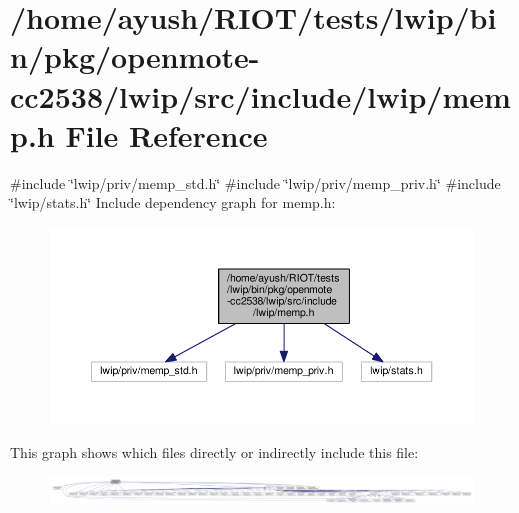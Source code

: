 \hypertarget{openmote-cc2538_2lwip_2src_2include_2lwip_2memp_8h}{}\section{/home/ayush/\+R\+I\+O\+T/tests/lwip/bin/pkg/openmote-\/cc2538/lwip/src/include/lwip/memp.h File Reference}
\label{openmote-cc2538_2lwip_2src_2include_2lwip_2memp_8h}
{\ttfamily \#include \char`\"{}lwip/priv/memp\+\_\+std.\+h\char`\"{}}\newline
{\ttfamily \#include \char`\"{}lwip/priv/memp\+\_\+priv.\+h\char`\"{}}\newline
{\ttfamily \#include \char`\"{}lwip/stats.\+h\char`\"{}}\newline
Include dependency graph for memp.\+h\+:
\nopagebreak
\begin{figure}[H]
\begin{center}
\leavevmode
\includegraphics[width=350pt]{openmote-cc2538_2lwip_2src_2include_2lwip_2memp_8h__incl}
\end{center}
\end{figure}
This graph shows which files directly or indirectly include this file\+:
\nopagebreak
\begin{figure}[H]
\begin{center}
\leavevmode
\includegraphics[width=350pt]{openmote-cc2538_2lwip_2src_2include_2lwip_2memp_8h__dep__incl}
\end{center}
\end{figure}
